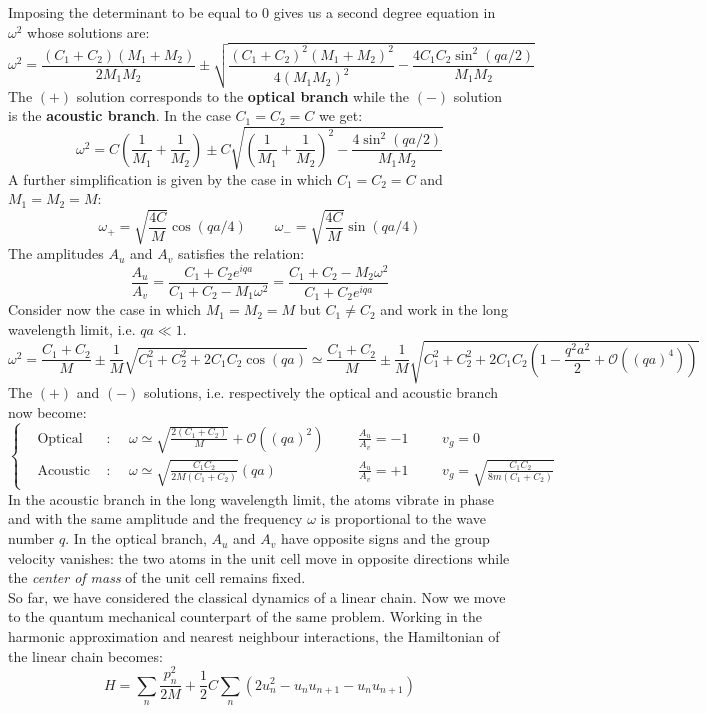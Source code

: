 \documentclass[10.75pt,a4paper,openright,bottom=2cm]{article}
\begin{document}
Imposing the determinant to be equal to 0 gives us a second degree equation in $\omega^2$ whose solutions are:
\[
\omega^2=\frac{(C_1+C_2)(M_1+M_2)}{2M_1M_2}\pm\sqrt{\frac{(C_1+C_2)^2(M_1+M_2)^2}{4(M_1M_2)^2}-\frac{4C_1C_2\sin^2(qa/2)}{M_1M_2}}
\]
The $(+)$ solution corresponds to the \textbf{optical branch} while the $(-)$ solution is the \textbf{acoustic branch}. In the case $C_1=C_2=C$ we get:
\[
\omega^2=C\left(\frac{1}{M_1}+\frac{1}{M_2}\right)\pm C\sqrt{\left(\frac{1}{M_1}+\frac{1}{M_2}\right)^2-\frac{4\sin^2(qa/2)}{M_1M_2}}
\]
A further simplification is given by the case in which $C_1=C_2=C$ and $M_1=M_2=M$:
\[
\omega_+=\sqrt{\frac{4C}{M}}\cos(qa/4) \qquad \omega_-=\sqrt{\frac{4C}{M}}\sin(qa/4)
\]
The amplitudes $A_u$ and $A_v$ satisfies the relation:
\[
\frac{A_u}{A_v}=\frac{C_1+C_2e^{iqa}}{C_1+C_2-M_1\omega^2}=\frac{C_1+C_2-M_2\omega^2}{C_1+C_2e^{iqa}}
\]
Consider now the case in which $M_1=M_2=M$ but $C_1\neq C_2$ and work in the long wavelength limit, i.e. $qa\ll1$.
\[
\omega^2=\frac{C_1+C_2}{M}\pm\frac{1}{M}\sqrt{C_1^2+C_2^2+2C_1C_2\cos(qa)}\simeq\frac{C_1+C_2}{M}\pm\frac{1}{M}\sqrt{C_1^2+C_2^2+2C_1C_2\left(1-\frac{q^2a^2}{2}+\mathcal{O}((qa)^4)\right)}
\]
The $(+)$ and $(-)$ solutions, i.e. respectively the optical and acoustic branch now become:
\[
\left\{
\begin{aligned}
&\text{Optical branch}: &&\omega\simeq\sqrt{\frac{2(C_1+C_2)}{M}}+\mathcal{O}((qa)^2) &&&\frac{A_u}{A_v}=-1 &&&v_g=0\\
&\text{Acoustic branch}: &&\omega\simeq\sqrt{\frac{C_1C_2}{2M(C_1+C_2)}}(qa) &&&\frac{A_u}{A_v}=+1 &&&v_g=\sqrt{\frac{C_1C_2}{8m(C_1+C_2)}}
\end{aligned}
\right.
\]
In the acoustic branch in the long wavelength limit, the atoms vibrate in phase and with the same amplitude and the frequency $\omega$ is proportional to the wave number $q$. In the optical branch, $A_u$ and $A_v$ have opposite signs and the group velocity vanishes: the two atoms in the unit cell move in opposite directions while the \textit{center of mass} of the unit cell remains fixed.\\
So far, we have considered the classical dynamics of a linear chain. Now we move to the quantum mechanical counterpart of the same problem. Working in the harmonic approximation and nearest neighbour interactions, the Hamiltonian of the linear chain becomes:
\begin{equation}
\label{H}
H=\sum_n\frac{p_n^2}{2M}+\frac{1}{2}C\sum_n(2u_n^2-u_nu_{n+1}-u_nu_{n+1})
\end{equation}
\end{document}
